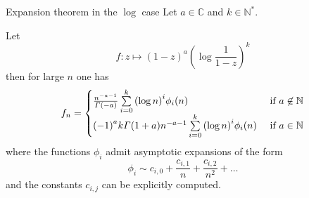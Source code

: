 \documentclass[../main.tex]{subfiles}
\begin{document}
\begin{thm}{Expansion theorem in the $\log$ case}\label{thm_expansion_log}
	Let $a \in \mathbb{C}$ and $k \in \mathbb{N}^*$.
	
	Let
	\[
	f : z \mapsto {(1 - z)}^{a} {\left( \log \frac{1}{1 - z} \right)}^k
	\]
	then for large $n$ one has
	\begin{align*}
	f_n =
	\begin{cases}
	\frac{n^{-a-1}}{\Gamma(-a)} \sum\limits_{i = 0}^k {(\log n)}^i \phi_i(n) &\text{ if $a \not\in \mathbb{N}$}\\
	{(-1)}^a k \Gamma(1 + a) n^{-a - 1} \sum\limits_{i = 0}^k {(\log n)}^i \phi_i(n) &\text{ if $a \in \mathbb{N}$}
	\end{cases}
	\end{align*}
	where the functions $\phi_i$ admit asymptotic expansions of the form
	\[
	\phi_i \sim c_{i, 0} + \frac{c_{i, 1}}{n} + \frac{c_{i, 2}}{n^2} + \dots
	\]
	and the constants $c_{i, j}$ can be explicitly computed.
\end{thm}
\end{document}
